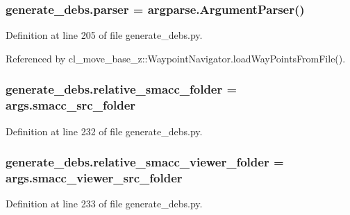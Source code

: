 \subsubsection[{\texorpdfstring{parser}{parser}}]{\setlength{\rightskip}{0pt plus 5cm}generate\+\_\+debs.\+parser = argparse.\+Argument\+Parser()}\hypertarget{namespacegenerate__debs_a4a9ae4bb85fc62d7973ea3d09ced6c26}{}\label{namespacegenerate__debs_a4a9ae4bb85fc62d7973ea3d09ced6c26}


Definition at line 205 of file generate\+\_\+debs.\+py.



Referenced by cl\+\_\+move\+\_\+base\+\_\+z\+::\+Waypoint\+Navigator.\+load\+Way\+Points\+From\+File().

\subsubsection[{\texorpdfstring{relative\+\_\+smacc\+\_\+folder}{relative_smacc_folder}}]{\setlength{\rightskip}{0pt plus 5cm}generate\+\_\+debs.\+relative\+\_\+smacc\+\_\+folder = args.\+smacc\+\_\+src\+\_\+folder}\hypertarget{namespacegenerate__debs_abf6925bd06ac1da3981fe638eefb5a61}{}\label{namespacegenerate__debs_abf6925bd06ac1da3981fe638eefb5a61}


Definition at line 232 of file generate\+\_\+debs.\+py.

\subsubsection[{\texorpdfstring{relative\+\_\+smacc\+\_\+viewer\+\_\+folder}{relative_smacc_viewer_folder}}]{\setlength{\rightskip}{0pt plus 5cm}generate\+\_\+debs.\+relative\+\_\+smacc\+\_\+viewer\+\_\+folder = args.\+smacc\+\_\+viewer\+\_\+src\+\_\+folder}\hypertarget{namespacegenerate__debs_a22d892b78adfce583710d78737eb4747}{}\label{namespacegenerate__debs_a22d892b78adfce583710d78737eb4747}


Definition at line 233 of file generate\+\_\+debs.\+py.

